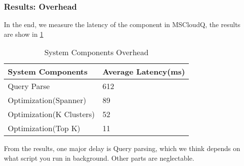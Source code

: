 \subsubsection{Results: Overhead}
\label{sec-4-4}
In the end, we measure  the latency of the component in MSCloudQ, the results are show in \ref{tab:overhead}
\begin{table}
    \centering
    \begin{tabular}{ | l | l |}
    \hline
    System Components & Average Latency(ms) \\ \hline
    Query Parse & 612 \\ \hline
    Optimization(Spanner) & 89 \\ \hline
    Optimization(K Clusters) & 52 \\ \hline
    Optimization(Top K) & 11 \\ \hline
    \end{tabular}
    \caption{System Components Overhead}
    \label{tab:overhead}
\end{table}
From the results, one major delay is Query parsing, which we think depends on what script you run in background. Other parts are neglectable.



